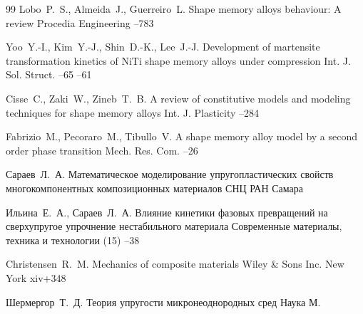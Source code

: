 \begin{thebibliography}{99}
\by Lobo~P.~S., Almeida~J., Guerreiro~L.
\paper Shape memory alloys behaviour: A review
\jour Procedia Engineering
--783

\by Yoo~Y.-I., Kim~Y.-J., Shin~D.-K., Lee~J.-J.
\paper Development of martensite transformation kinetics of NiTi shape memory alloys under compression
\jour Int. J. Sol. Struct.
--65
--61

\by Cisse~C., Zaki~W., Zineb~T.~B.
\paper A review of constitutive models and modeling techniques for shape memory alloys
\jour Int. J. Plasticity 
--284

\by Fabrizio~M., Pecoraro~M., Tibullo~V.
\paper A shape memory alloy model by a second order phase transition
\jour Mech. Res. Com.
--26

\by Сараев~Л.~А.
\book Математическое моделирование упругопластических свойств многокомпонентных композиционных материалов
\publ СНЦ РАН
\publaddr Самара

\by Ильина~Е.~А., Сараев~Л.~А.
\paper Влияние кинетики фазовых превращений на сверхупругое упрочнение нестабильного материала
\jour Современные материалы, техника и технологии
(15)
--38

\by Christensen~R.~M.
\book Mechanics of composite materials
\publ Wiley \& Sons Inc.
\publaddr New York
\totalpages xiv+348



\by Шермергор~Т.~Д.
\book Теория упругости микронеоднородных сред
\publ Наука
\publaddr М.


\end{thebibliography}
